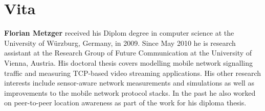 \chapter*{Vita}
%

\textbf{Florian Metzger} received his Diplom degree in computer science at the University of Würzburg, Germany, in 2009. Since May 2010 he is research assistant at the Research Group of Future Communication at the University of Vienna, Austria. His doctoral thesis covers modelling mobile network signalling traffic and measuring TCP-based video streaming applications. His other research interests include sensor-aware network measurements and simulations as well as improvements to the mobile network protocol stacks. In the past he also worked on peer-to-peer location awareness as part of the work for his diploma thesis.
